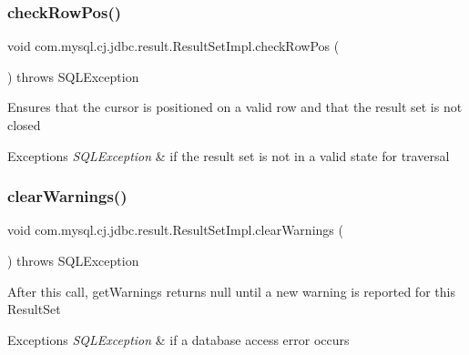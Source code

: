\subsubsection{\texorpdfstring{check\+Row\+Pos()}{checkRowPos()}}
{\footnotesize\ttfamily void com.\+mysql.\+cj.\+jdbc.\+result.\+Result\+Set\+Impl.\+check\+Row\+Pos (\begin{DoxyParamCaption}{ }\end{DoxyParamCaption}) throws S\+Q\+L\+Exception\hspace{0.3cm}{\ttfamily [protected]}}

Ensures that the cursor is positioned on a valid row and that the result set is not closed


\begin{DoxyExceptions}{Exceptions}
{\em S\+Q\+L\+Exception} & if the result set is not in a valid state for traversal \\
\hline
\end{DoxyExceptions}
\mbox{\label{classcom_1_1mysql_1_1cj_1_1jdbc_1_1result_1_1_result_set_impl_aa785bccb5adae1c8f447ccd47cd92ec6}} 
\subsubsection{\texorpdfstring{clear\+Warnings()}{clearWarnings()}}
{\footnotesize\ttfamily void com.\+mysql.\+cj.\+jdbc.\+result.\+Result\+Set\+Impl.\+clear\+Warnings (\begin{DoxyParamCaption}{ }\end{DoxyParamCaption}) throws S\+Q\+L\+Exception}

After this call, get\+Warnings returns null until a new warning is reported for this Result\+Set


\begin{DoxyExceptions}{Exceptions}
{\em S\+Q\+L\+Exception} & if a database access error occurs \\
\hline
\end{DoxyExceptions}
\mbox{\label{classcom_1_1mysql_1_1cj_1_1jdbc_1_1result_1_1_result_set_impl_aa660f8429c96f057e5c3046f32a06a18}} 
